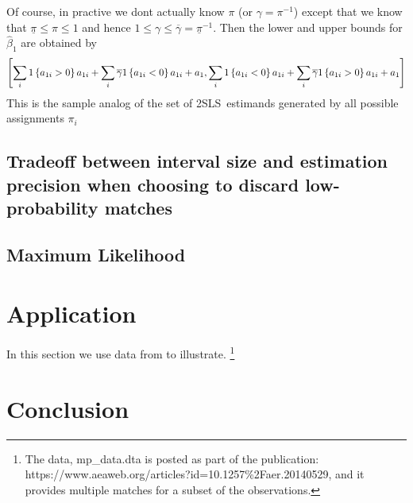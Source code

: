 \documentclass[12pt]{article}
\renewcommand{\cite}{\citeasnoun}
\begin{document}
Of course, in practive we dont actually know $\pi $ (or $\gamma =\pi ^{-1}$)
except that we know that $\underline{\pi }\leq \pi \leq 1$ and hence $1\leq
\gamma \leq \overline{\gamma }=\underline{\pi }^{-1}$. Then the lower and
upper bounds for $\widehat{\beta }_{1}$ are obtained by
\begin{equation*}
\left[ \dsum_{i}1\left\{ a_{1i}>0\right\} a_{1i}+\dsum_{i}\overline{\gamma }%
1\left\{ a_{1i}<0\right\} a_{1i}+a_{1},\dsum_{i}1\left\{ a_{1i}<0\right\}
a_{1i}+\dsum_{i}\overline{\gamma }1\left\{ a_{1i}>0\right\} a_{1i}+a_{1}%
\right]
\end{equation*}%
This is the sample analog of the set of 2SLS\ estimands generated by all
possible assignments $\pi _{i}$

\subsection{Tradeoff between interval size and estimation precision when
choosing to discard low-probability matches}

\subsection{Maximum Likelihood}

\section{Application}

In this section we use data from \cite{AizerEliFerrieLLerasMuney2016} to
illustrate. \footnote{%
The data, mp\_data.dta is posted as part of the publication:
https://www.aeaweb.org/articles?id=10.1257\%2Faer.20140529, and it provides
multiple matches for a subset of the observations.}

\section{Conclusion}




\end{document}

